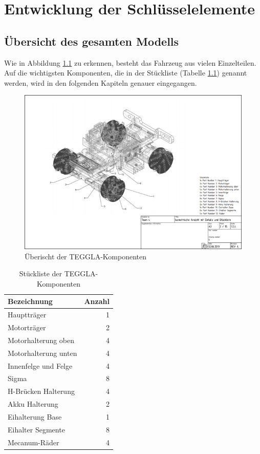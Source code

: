 \chapter{Entwicklung der Schlüsselelemente}
\section{Übersicht des gesamten Modells}
Wie in Abbildung \ref{bild:tegglaoverview} zu erkennen, besteht das Fahrzeug aus vielen Einzelteilen. 
Auf die wichtigsten Komponenten, die in der Stückliste (Tabelle \ref{table:tegglaoverview}) genannt werden, wird in den folgenden Kapiteln genauer eingegangen.
\begin{figure}[!ht]
	\centering
	\includegraphics[width=\textwidth]{bilder/overview.png}
	\caption{Überischt der TEGGLA-Komponenten}
	\label{bild:tegglaoverview}
\end{figure}

\begin{table}[!ht]
\centering
\begin{tabular}{lr}
	Bezeichnung & Anzahl \\ 
	\midrule[3pt] 
	Hauptträger            & 1 \\ \midrule
	Motorträger            & 2 \\ \midrule
	Motorhalterung oben    & 4 \\ \midrule
	Motorhalterung unten   & 4 \\ \midrule
	Innenfelge und Felge   & 4 \\ \midrule
	Sigma                  & 8 \\ \midrule
	H-Brücken Halterung    & 4 \\ \midrule
	Akku Halterung         & 2 \\ \midrule
	Eihalterung Base       & 1 \\ \midrule
	Eihalter Segmente      & 8 \\ \midrule
	Mecanum-Räder          & 4
\end{tabular} 
\caption{Stückliste der TEGGLA-Komponenten} 
\label{table:tegglaoverview}
\end{table} 



